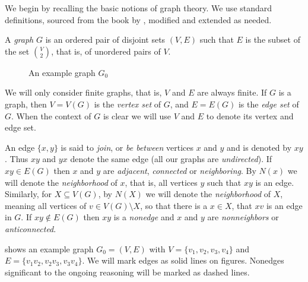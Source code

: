 We begin by recalling the basic notions of graph theory. We use standard definitions, sourced from the book by \citeauthor{BB98} , modified and extended as needed.

\begin{defn}[graph]
  A \emph{graph} $G$ is an ordered pair of disjoint sets $(V, E)$ such that $E$ is the subset of the set $V \choose 2$, that is, of unordered pairs of $V$.
\end{defn}

\begin{wrapfigure}{r}{0.4\textwidth}
  \centering{}
  \caption{An example graph $G_0$}
  \label{fig:examplePath}
\end{wrapfigure}

We will only consider finite graphs, that is, $V$ and $E$ are always finite. If $G$ is a graph, then $V = V(G)$ is the \emph{vertex set} of $G$, and $E = E(G)$ is the \emph{edge set} of $G$. When the context of $G$ is clear we will use $V$ and $E$ to denote its vertex and edge set.

An edge $\{x, y\}$ is said to \emph{join}, or \emph{be between} vertices $x$ and $y$ and is denoted by $xy$. Thus $xy$ and $yx$ denote the same edge (all our graphs are \emph{undirected}). If $xy \in E(G)$ then $x$ and $y$ are \emph{adjacent}, \emph{connected} or \emph{neighboring}. By $N(x)$ we will denote the \emph{neighborhood} of $x$, that is, all vertices $y$ such that $xy$ is an edge. Similarly, for $X \subseteq V(G)$, by $N(X)$ we will denote the \emph{neighborhood} of $X$, meaning all vertices of $v \in V(G) \setminus X$, so that there is a $x \in X$, that $xv$ is an edge in $G$. If $xy \notin E(G)$ then $xy$ is a \emph{nonedge} and $x$ and $y$ are \emph{nonneighbors} or \emph{anticonnected}.

 shows an example graph $G_0 = (V, E)$ with $V = \{v_1, v_2, v_3, v_4\}$ and $E = \{v_1v_2, v_2v_3, v_3v_4\}$. We will mark edges as solid lines on figures. Nonedges significant to the ongoing reasoning will be marked as dashed lines.

